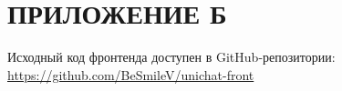 \section*{ПРИЛОЖЕНИЕ Б}

Исходный код фронтенда доступен в GitHub-репозитории:
\href{https://github.com/BeSmileV/unichat-front}{https://github.com/BeSmileV/unichat-front}


